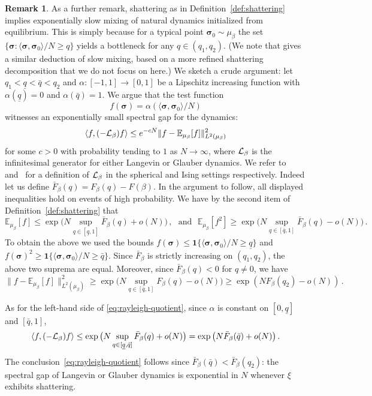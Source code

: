 \documentclass[11pt]{article}
\theoremstyle{definition}
\newtheorem{remark}[theorem]{Remark}
\numberwithin{equation}{section}
\newcommand{\<}{\langle}
\renewcommand{\>}{\rangle}
\def\bbE{{\mathbb{E}}}
\def\la{\langle}
\def\ra{\rangle}
\newcommand{\ubq}{\bar{q}}
\newcommand{\lbq}{\underline{q}}
\def\bsig{{\boldsymbol {\sigma}}}
\def\one{{\mathbf{1}}}
\def\cL{{\cal L}}
\begin{document}
\begin{remark}
\label{rem:shattering}
As a further remark, shattering as in Definition~\ref{def:shattering} implies exponentially slow mixing of natural dynamics initialized from equilibrium. This is simply because for a typical point $\bsig_0\sim\mu_{\beta}$ the set $\{\bsig:\la\bsig,\bsig_0\ra/N\geq q\}$ yields a bottleneck for any $q \in (q_1,q_2)$. 
(We note that \cite[Corollary 2.8]{alaoui2023shattering} gives a similar deduction of slow mixing, based on a more refined shattering decomposition that we do not focus on here.)
We sketch a crude argument: let $q_1< \lbq < \ubq < q_2$ and $\alpha:[-1,1]\to [0,1]$ be a Lipschitz increasing function with $\alpha(\lbq)=0$ and $\alpha(\ubq)=1$.
We argue that the test function 
\[
f(\bsig)
=
\alpha(\la\bsig,\bsig_0\ra/N)
\]
witnesses an exponentially small spectral gap for the dynamics: 
\begin{equation}
\label{eq:rayleigh-quotient}
\la f,(-\cL_{\beta}) f\ra\leq e^{-cN} \|f-\bbE_{\mu_{\beta}}[f]\|_{L^2(\mu_\beta)}^2
\end{equation}
for some $c>0$ with probability tending to $1$ as $N \to \infty$, where $\cL_{\beta}$ is the infinitesimal generator for either Langevin or Glauber dynamics. We refer to~\cite{gheissari2019spectral} and~\cite{eldan2021spectral} for a definition of $\cL_{\beta}$ in the spherical and Ising settings respectively. 
Indeed let us define $\bar{F}_{\beta}(q) = F_{\beta}(q) - F(\beta)$. 
In the argument to follow, all displayed inequalities hold on events of high probability.  
We have by the second item  of Definition~\ref{def:shattering} that 
\begin{equation*}
\bbE_{\mu_{\beta}}[f] \leq \exp\big(N \sup_{q\in [\lbq,1]} \bar{F}_{\beta}(q) +o(N)\big)\,,~~~\mbox{and}~~~
\bbE_{\mu_{\beta}}[f^2] \ge \exp\big(N \sup_{q\in [\ubq,1]} \bar{F}_{\beta}(q) -o(N)\big)\,.
\end{equation*}
To obtain the above we used the bounds $f(\bsig) \le \one\{\la\bsig,\bsig_0\ra/N \ge \lbq\}$ and $f(\bsig)^2\ge \one\{\la\bsig,\bsig_0\ra/N \ge \ubq\}$. 
Since $\bar{F}_{\beta}$ is strictly increasing on $(q_1,q_2)$, the above two suprema are equal. Moreover, since $\bar{F}_{\beta}(q)<0$ for $q\neq 0$, we have  
\[ \|f-\bbE_{\mu_{\beta}}[f]\|_{L^2(\mu_\beta)}^2 \ge \exp\big(N \sup_{q\in [\ubq,1]} F_{\beta}(q) - o(N)\big)\geq \exp(N F_{\beta}(q_2)- o(N))\,.\]

As for the left-hand side of \eqref{eq:rayleigh-quotient}, since $\alpha$ is constant on $[0,\lbq]$ and $[\ubq,1]$, 
\[\la f,(-\cL_{\beta}) f\ra \le \exp\big(N \sup_{q\in [\lbq,\ubq]}
\bar{F}_{\beta}(q) +o(N)\big) = \exp\big(N
\bar{F}_{\beta}(\ubq) +o(N)\big)\,.\]
The conclusion~\eqref{eq:rayleigh-quotient} follows since $\bar{F}_{\beta}(\ubq) < \bar{F}_{\beta}(q_2)$: the spectral gap of Langevin or Glauber dynamics is exponential in $N$ whenever $\xi$ exhibits shattering.
\end{remark}
\end{document}
